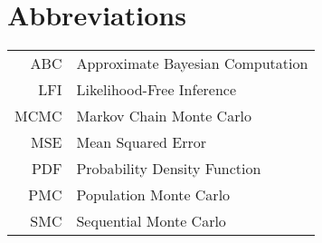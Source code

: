 \chapter*{Abbreviations}
\thispagestyle{plain}



\begin{longtable}{rl}
    ABC & Approximate Bayesian Computation \\
    LFI & Likelihood-Free Inference \\
    MCMC & Markov Chain Monte Carlo \\
    MSE & Mean Squared Error \\
    PDF & Probability Density Function \\
    PMC & Population Monte Carlo \\
    SMC & Sequential Monte Carlo
\end{longtable}


